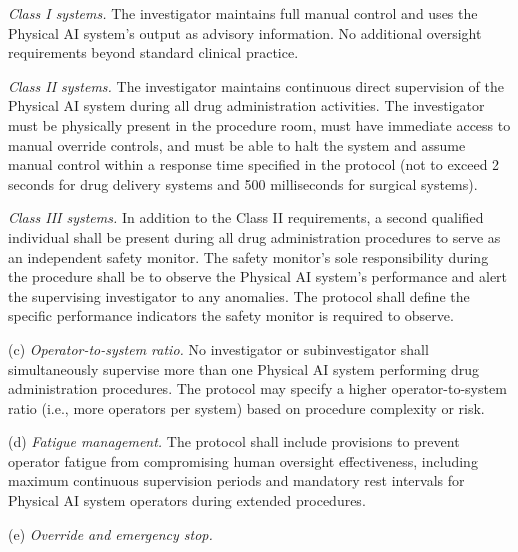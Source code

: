 \documentclass[11pt]{article}
\begin{document}
\begin{description}[leftmargin=0.8cm,style=sameline]
\item[(1)] \textit{Class I systems.} The investigator maintains full manual control and uses the Physical AI system's output as advisory information. No additional oversight requirements beyond standard clinical practice.
\item[(2)] \textit{Class II systems.} The investigator maintains continuous direct supervision of the Physical AI system during all drug administration activities. The investigator must be physically present in the procedure room, must have immediate access to manual override controls, and must be able to halt the system and assume manual control within a response time specified in the protocol (not to exceed 2 seconds for drug delivery systems and 500 milliseconds for surgical systems).
\item[(3)] \textit{Class III systems.} In addition to the Class II requirements, a second qualified individual shall be present during all drug administration procedures to serve as an independent safety monitor. The safety monitor's sole responsibility during the procedure shall be to observe the Physical AI system's performance and alert the supervising investigator to any anomalies. The protocol shall define the specific performance indicators the safety monitor is required to observe.
\end{description}

(c) \textit{Operator-to-system ratio.} No investigator or subinvestigator shall simultaneously supervise more than one Physical AI system performing drug administration procedures. The protocol may specify a higher operator-to-system ratio (i.e., more operators per system) based on procedure complexity or risk.

(d) \textit{Fatigue management.} The protocol shall include provisions to prevent operator fatigue from compromising human oversight effectiveness, including maximum continuous supervision periods and mandatory rest intervals for Physical AI system operators during extended procedures.

(e) \textit{Override and emergency stop.}
\end{document}
